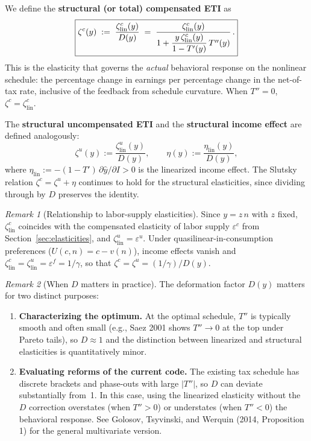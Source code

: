 \documentclass[12pt,a4paper]{article}
\theoremstyle{definition}
\theoremstyle{plain}
\theoremstyle{remark}
\newtheorem{remark}{Remark}[section]
\begin{document}
We define the \textbf{structural (or total) compensated ETI} as
\begin{equation}
\label{eq:ETI-def}
  \boxed{%
  \zeta^c(y)
  \;:=\;
  \frac{\zeta^c_{\mathrm{lin}}(y)}{D(y)}
  \;=\;
  \frac{\zeta^c_{\mathrm{lin}}(y)}{1 + \dfrac{y\,\zeta^c_{\mathrm{lin}}(y)}{1-T'(y)}\,T''(y)}\,.}
\end{equation}
This is the elasticity that governs the \emph{actual} behavioral response on the nonlinear schedule: the percentage change in earnings per percentage change in the net-of-tax rate, inclusive of the feedback from schedule curvature. When $T''=0$, $\zeta^c = \zeta^c_{\mathrm{lin}}$.

\smallskip
\noindent
The \textbf{structural uncompensated ETI} and the \textbf{structural income effect} are defined analogously:
\[
  \zeta^u(y) := \frac{\zeta^u_{\mathrm{lin}}(y)}{D(y)}, \qquad
  \eta(y) := \frac{\eta_{\mathrm{lin}}(y)}{D(y)},
\]
where $\eta_{\mathrm{lin}} := -(1-T')\,\partial \hat{y}/\partial I > 0$ is the linearized income effect. The Slutsky relation $\zeta^c = \zeta^u + \eta$ continues to hold for the structural elasticities, since dividing through by $D$ preserves the identity.

\begin{remark}[Relationship to labor-supply elasticities]
Since $y=z\,n$ with $z$ fixed, $\zeta^c_{\mathrm{lin}}$ coincides with the
compensated elasticity of labor supply $\varepsilon^c$ from
Section~\ref{sec:elasticities}, and $\zeta^u_{\mathrm{lin}} = \varepsilon^u$.
Under quasilinear-in-consumption preferences ($U(c,n)=c-v(n)$),
income effects vanish and
$\zeta^c_{\mathrm{lin}}=\zeta^u_{\mathrm{lin}}=\varepsilon^f=1/\gamma$, so that $\zeta^c = \zeta^u = (1/\gamma)/D(y)$.
\end{remark}

\begin{remark}[When $D$ matters in practice]
The deformation factor $D(y)$ matters for two distinct purposes:
\begin{enumerate}[leftmargin=2em]
  \item \textbf{Characterizing the optimum.} At the optimal schedule, $T''$ is typically smooth and often small (e.g., Saez 2001 shows $T'' \to 0$ at the top under Pareto tails), so $D \approx 1$ and the distinction between linearized and structural elasticities is quantitatively minor.
  \item \textbf{Evaluating reforms of the current code.} The existing tax schedule has discrete brackets and phase-outs with large $|T''|$, so $D$ can deviate substantially from~1. In this case, using the linearized elasticity without the $D$ correction overstates (when $T''>0$) or understates (when $T''<0$) the behavioral response. See Golosov, Tsyvinski, and Werquin (2014, Proposition 1) for the general multivariate version.
\end{enumerate}
\end{remark}
\end{document}

